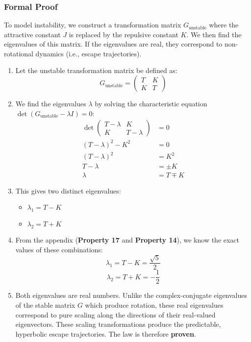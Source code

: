 \subsubsection*{Formal Proof}
To model instability, we construct a transformation matrix $G_{\text{unstable}}$ where the attractive constant $J$ is replaced by the repulsive constant $K$. We then find the eigenvalues of this matrix. If the eigenvalues are real, they correspond to non-rotational dynamics (i.e., escape trajectories).

\begin{enumerate}
    \item Let the unstable transformation matrix be defined as:
    $$ G_{\text{unstable}} = \begin{pmatrix} T & K \\ K & T \end{pmatrix} $$
    
    \item We find the eigenvalues $\lambda$ by solving the characteristic equation $\det(G_{\text{unstable}} - \lambda I) = 0$:
    \begin{align*}
        \det \begin{pmatrix} T-\lambda & K \\ K & T-\lambda \end{pmatrix} &= 0 \\
        (T-\lambda)^2 - K^2 &= 0 \\
        (T-\lambda)^2 &= K^2 \\
        T-\lambda &= \pm K \\
        \lambda &= T \mp K
    \end{align*}
    
    \item This gives two distinct eigenvalues:
    \begin{itemize}
        \item $\lambda_1 = T - K$
        \item $\lambda_2 = T + K$
    \end{itemize}
    
    \item From the appendix (\textbf{Property 17} and \textbf{Property 14}), we know the exact values of these combinations:
    $$ \lambda_1 = T - K = \frac{\sqrt{5}}{2} $$
    $$ \lambda_2 = T + K = -\frac{1}{2} $$
    
    \item Both eigenvalues are real numbers. Unlike the complex-conjugate eigenvalues of the stable matrix $G$ which produce rotation, these real eigenvalues correspond to pure scaling along the directions of their real-valued eigenvectors. These scaling transformations produce the predictable, hyperbolic escape trajectories. The law is therefore \textbf{proven}.
\end{enumerate}


